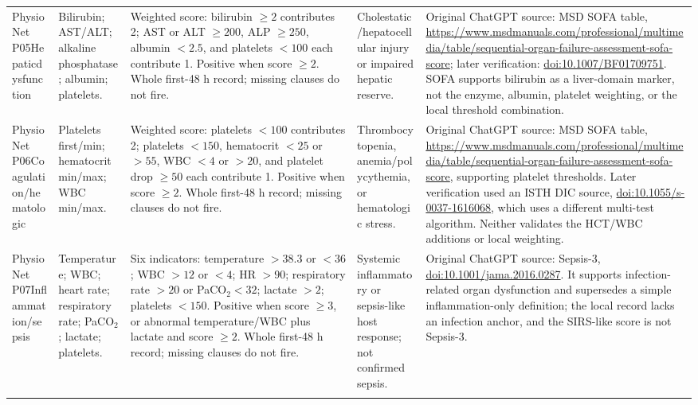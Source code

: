 \documentclass[letterpaper,10pt]{article}
\begin{document}
\begin{landscape}
\begin{longtable}{@{}L{0.88in}L{1.72in}L{2.32in}L{1.05in}L{2.82in}@{}}
PhysioNet P05\newline Hepatic\newline dysfunction &
Bilirubin; AST/ALT; alkaline phosphatase; albumin; platelets. &
Weighted score: bilirubin $\geq2$ contributes 2; AST or ALT $\geq200$,
ALP $\geq250$, albumin $<2.5$, and platelets $<100$ each contribute 1.
Positive when score $\geq2$. Whole first-48 h record; missing clauses do
not fire. &
Cholestatic/hepatocellular injury or impaired hepatic reserve. &
Original ChatGPT source: MSD SOFA table,
\url{https://www.msdmanuals.com/professional/multimedia/table/sequential-organ-failure-assessment-sofa-score};
later verification:
\href{https://doi.org/10.1007/BF01709751}{doi:10.1007/BF01709751}.
SOFA supports bilirubin as a liver-domain marker, not the enzyme, albumin,
platelet weighting, or the local threshold combination. \\
\addlinespace

PhysioNet P06\newline Coagulation/\newline hematologic &
Platelets first/min; hematocrit min/max; WBC min/max. &
Weighted score: platelets $<100$ contributes 2; platelets $<150$,
hematocrit $<25$ or $>55$, WBC $<4$ or $>20$, and platelet drop
$\geq50$ each contribute 1. Positive when score $\geq2$. Whole first-48 h
record; missing clauses do not fire. &
Thrombocytopenia, anemia/polycythemia, or hematologic stress. &
Original ChatGPT source: MSD SOFA table,
\url{https://www.msdmanuals.com/professional/multimedia/table/sequential-organ-failure-assessment-sofa-score},
supporting platelet thresholds. Later verification used an ISTH DIC source,
\href{https://doi.org/10.1055/s-0037-1616068}
{doi:10.1055/s-0037-1616068}, which uses a different multi-test algorithm.
Neither validates the HCT/WBC additions or local weighting. \\
\addlinespace

PhysioNet P07\newline Inflammation/\newline sepsis &
Temperature; WBC; heart rate; respiratory rate; PaCO$_2$; lactate;
platelets. &
Six indicators: temperature $>38.3$ or $<36$; WBC $>12$ or $<4$;
HR $>90$; respiratory rate $>20$ or PaCO$_2<32$; lactate $>2$;
platelets $<150$. Positive when score $\geq3$, or abnormal temperature/WBC
plus lactate and score $\geq2$. Whole first-48 h record; missing clauses do
not fire. &
Systemic inflammatory or sepsis-like host response; not confirmed sepsis. &
Original ChatGPT source: Sepsis-3,
\href{https://doi.org/10.1001/jama.2016.0287}
{doi:10.1001/jama.2016.0287}. It supports infection-related organ
dysfunction and supersedes a simple inflammation-only definition; the local
record lacks an infection anchor, and the SIRS-like score is not Sepsis-3. \\
\addlinespace


\end{longtable}
\end{landscape}
\end{document}
